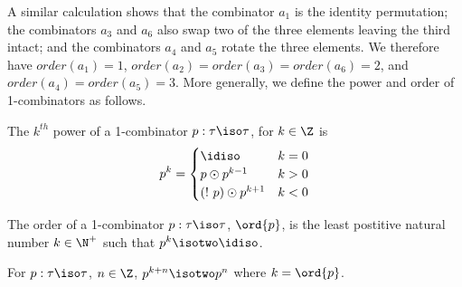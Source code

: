 A similar calculation shows that the combinator $a_1$ is the identity
permutation; the combinators $a_3$ and $a_6$ also swap two of the
three elements leaving the third intact; and the combinators $a_4$ and
$a_5$ rotate the three elements. We therefore have
$\mathit{order}(a_1)=1$,
$\mathit{order}(a_2)=\mathit{order}(a_3)=\mathit{order}(a_6)=2$, and
$\mathit{order}(a_4)=\mathit{order}(a_5)=3$. More generally, we define
the power and order of 1-combinators as follows.

\begin{definition}
  The $k^{th}$ power of a 1-combinator $p : \tau \iso \tau$, for
  $k \in \Z$ is
  \[
    p^k =
  \begin{cases}
    \idiso & k = 0 \\
    p \odot p^{k - 1} & k > 0 \\
    (!~p) \odot p^{k + 1} & k < 0 \\
  \end{cases}
  \]
\end{definition}

\begin{definition}
  The order of a 1-combinator $p : \tau \iso \tau$, $\ord{p}$, is the
  least postitive natural number $k \in \N^+$ such that
  $p^k \isotwo \idiso$.
\end{definition}



\begin{lemma}
  For $p : \tau \iso \tau$, $n \in \Z$, $p^{k + n} \isotwo p^n$ where
  $k = \ord{p}$.
\end{lemma}


